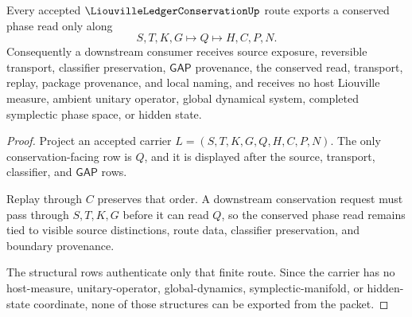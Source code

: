 \begin{theorem}
\label{thm:liouville-ledger-conservation-export-discipline}
Every accepted $\LiouvilleLedgerConservationUp$ route exports a conserved phase read only along
$$
S,T,K,G \longmapsto Q \longmapsto H,C,P,N .
$$
Consequently a downstream consumer receives source exposure, reversible transport, classifier preservation, $\mathsf{GAP}$ provenance, the conserved read, transport, replay, package provenance, and local naming, and receives no host Liouville measure, ambient unitary operator, global dynamical system, completed symplectic phase space, or hidden state.
\end{theorem}
\begin{proof}
Project an accepted carrier $L=(S,T,K,G,Q,H,C,P,N)$. The only conservation-facing row is $Q$, and it is displayed after the source, transport, classifier, and $\mathsf{GAP}$ rows.

Replay through $C$ preserves that order. A downstream conservation request must pass through $S,T,K,G$ before it can read $Q$, so the conserved phase read remains tied to visible source distinctions, route data, classifier preservation, and boundary provenance.

The structural rows authenticate only that finite route. Since the carrier has no host-measure, unitary-operator, global-dynamics, symplectic-manifold, or hidden-state coordinate, none of those structures can be exported from the packet.
\end{proof}


\begin{closurestatus}{\LiouvilleLedgerConservationUp}
  \theoryclosure{\seedClosure}
  \formalstatus{\unformalizedV}
\end{closurestatus}
